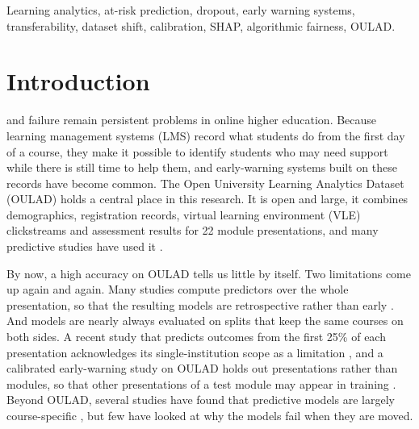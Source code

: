\documentclass[journal]{IEEEtran}
\begin{document}
\begin{IEEEkeywords}
Learning analytics, at-risk prediction, dropout, early warning systems, transferability, dataset shift, calibration, SHAP, algorithmic fairness, OULAD.
\end{IEEEkeywords}

\section{Introduction}
\label{sec:intro}

 and failure remain persistent problems in online higher education. Because learning management systems (LMS) record what students do from the first day of a course, they make it possible to identify students who may need support while there is still time to help them, and early-warning systems built on these records have become common. The Open University Learning Analytics Dataset (OULAD) \cite{kuzilek2017oulad} holds a central place in this research. It is open and large, it combines demographics, registration records, virtual learning environment (VLE) clickstreams and assessment results for 22 module presentations, and many predictive studies have used it \cite{jin2024slr}.

By now, a high accuracy on OULAD tells us little by itself. Two limitations come up again and again. Many studies compute predictors over the whole presentation, so that the resulting models are retrospective rather than early \cite{elsayed2026fairness}. And models are nearly always evaluated on splits that keep the same courses on both sides. A recent study that predicts outcomes from the first 25\% of each presentation acknowledges its single-institution scope as a limitation \cite{malkani2026kronecker}, and a calibrated early-warning study on OULAD holds out presentations rather than modules, so that other presentations of a test module may appear in training \cite{wu2026calibrated}. Beyond OULAD, several studies have found that predictive models are largely course-specific \cite{gasevic2016onesize,conijn2017lms,lopezzambrano2020portability}, but few have looked at why the models fail when they are moved.
\end{document}
